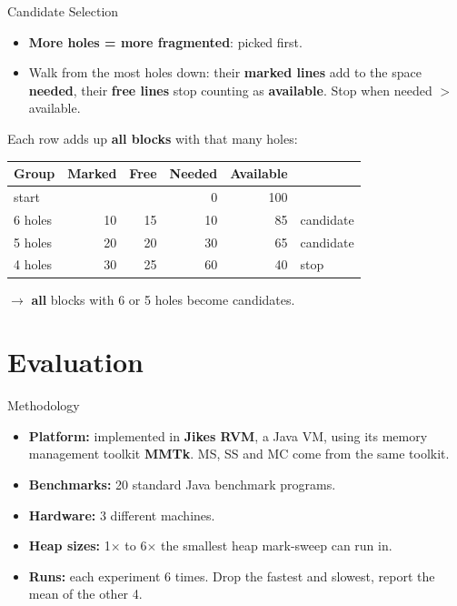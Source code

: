 \documentclass[aspectratio=169]{beamer}
\begin{document}
\begin{frame}{Candidate Selection}
	\begin{itemize}
		\item \textbf{More holes = more fragmented}: picked first.
		\item Walk from the most holes down: their \textbf{marked lines} add to the space \textbf{needed}, their \textbf{free lines} stop counting as \textbf{available}. Stop when \alert{needed $>$ available}.
	\end{itemize}

	\centering
	\small
	Each row adds up \textbf{all blocks} with that many holes:

	\smallskip
	\begin{tabular}{@{}lrrrrl@{}}
		\toprule
		\textbf{Group} & \textbf{Marked} & \textbf{Free} & \textbf{Needed} & \textbf{Available} &                                     \\
		\midrule
		start          &                 &               & 0               & 100                &                                     \\
		6 holes        & 10              & 15            & 10              & 85                 & \textcolor{themeExample}{candidate} \\
		5 holes        & 20              & 20            & 30              & 65                 & \textcolor{themeExample}{candidate} \\
		4 holes        & 30              & 25            & 60              & 40                 & \alert{stop}                        \\
		\bottomrule
	\end{tabular}

	\smallskip
	$\to$ \textbf{all} blocks with 6 or 5 holes become candidates.
\end{frame}

\section{Evaluation}

\begin{frame}{Methodology}
	\begin{itemize}
		\item \textbf{Platform:} implemented in \textbf{Jikes RVM}, a Java VM, using its memory management toolkit \textbf{MMTk}. MS, SS and MC come from the same toolkit.
		\item \textbf{Benchmarks:} 20 standard Java benchmark programs.
		\item \textbf{Hardware:} 3 different machines.
		\item \textbf{Heap sizes:} 1$\times$ to 6$\times$ the smallest heap mark-sweep can run in.
		\item \textbf{Runs:} each experiment 6 times. Drop the fastest and slowest, report the mean of the other 4.
	\end{itemize}
\end{frame}
\end{document}
